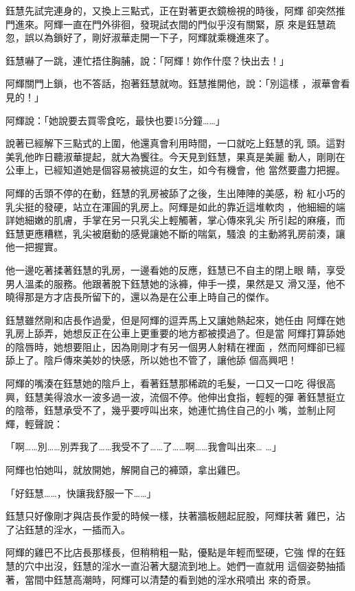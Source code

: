 鈺慧先試完連身的，又換上三點式，正在對著更衣鏡檢視的時後，阿輝
卻突然推門進來。阿輝一直在門外徘徊，發現試衣間的門似乎沒有關緊，原
來是鈺慧疏忽，誤以為鎖好了，剛好淑華走開一下子，阿輝就乘機進來了。

鈺慧嚇了一跳，連忙捂住胸脯，說：「阿輝！妳作什麼？快出去！」

阿輝關門上鎖，也不答話，抱著鈺慧就吻。鈺慧推開他，說：「別這樣
，淑華會看見的！」

阿輝說：「她說要去買零食吃，最快也要15分鐘……」

說著已經解下三點式的上圍，他還真會利用時間，一口就吃上鈺慧的乳
頭。這對美乳他昨日聽淑華提起，就大為饗往。今天見到鈺慧，果真是美麗
動人，剛剛在公車上，已經知道她是個容易被挑逗的女生，如今有機會，他
當然要盡力把握。

阿輝的舌頭不停的在動，鈺慧的乳房被舔了之後，生出陣陣的美感，粉
紅小巧的乳尖挺的發硬，站立在渾圓的乳房上。阿輝是如此的靠近這堆軟肉
，他細細的端詳她細嫩的肌膚，手掌在另一只乳尖上輕觸著，掌心傳來乳尖
所引起的麻癢，而鈺慧更應糟糕，乳尖被磨動的感覺讓她不斷的喘氣，騷浪
的主動將乳房前湊，讓他一把握實。

他一邊吃著揉著鈺慧的乳房，一邊看她的反應，鈺慧已不自主的閉上眼
睛，享受男人溫柔的服務。他跟著脫下鈺慧她的泳褲，伸手一摸，果然是又
滑又溼，他不曉得那是方才店長所留下的，還以為是在公車上時自己的傑作。

鈺慧雖然剛和店長作過愛，但是阿輝的逗弄馬上又讓她熱起來，她任由
阿輝在她乳房上舔弄，她想反正在公車上更重要的地方都被摸過了。但是當
阿輝打算舔她的陰唇時，她想要阻止，因為剛剛才有另一個男人射精在裡面
，然而阿輝卻已經舔上了。陰戶傳來美妙的快感，所以她也不管了，讓他舔
個高興吧！

阿輝的嘴湊在鈺慧她的陰戶上，看著鈺慧那稀疏的毛髮，一口又一口吃
得很高興，鈺慧美得浪水一波多過一波，流個不停。他伸出食指，輕輕的彈
著鈺慧挺立的陰蒂，鈺慧承受不了，幾乎要哼叫出來，她連忙摀住自己的小
嘴，並制止阿輝，輕聲說：

「啊……別……別弄我了……我受不了……了……啊……我會叫出來…
…」

阿輝也怕她叫，就放開她，解開自己的褲頭，拿出雞巴。

「好鈺慧……，快讓我舒服一下……」

鈺慧只好像剛才與店長作愛的時候一樣，扶著牆板翹起屁股，阿輝扶著
雞巴，沾了沾鈺慧的淫水，一插而入。

阿輝的雞巴不比店長那樣長，但稍稍粗一點，優點是年輕而堅硬，它強
悍的在鈺慧的穴中出沒，鈺慧的淫水一直沿著大腿流到地上。她們一直就用
這個姿勢抽插著，當間中鈺慧高潮時，阿輝可以清楚的看到她的淫水飛噴出
來的奇景。

